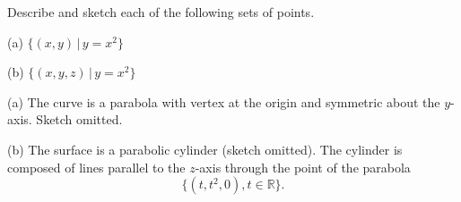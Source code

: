 \documentclass{ximera}
\begin{document}
\begin{question}  \label{Q44435313}
Describe and sketch each of the following sets of points.

(a) $\{ (x,y) \, | \, y=x^2 \}$

(b) $\{ (x,y,z) \, | \, y=x^2 \}$

\begin{explanation}
(a) The curve is a parabola with vertex at the origin and symmetric about the $y$-axis. Sketch omitted.

(b) The surface is a parabolic cylinder (sketch omitted). The cylinder is composed of lines parallel to the $z$-axis through the point of the parabola
\[
         \{  (t,t^2,0) , t \in \mathbb{R}     \} .
\]
\end{explanation}

\end{question}
\end{document}
